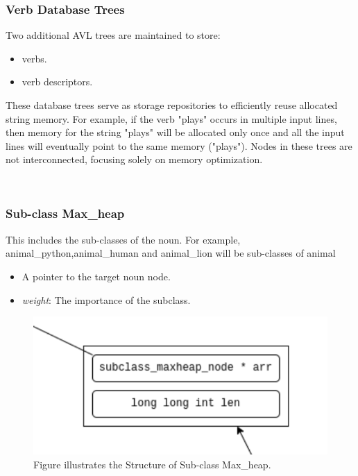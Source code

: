 \documentclass[conference]{IEEEtran}
\begin{document}
\subsubsection{Verb Database Trees}
Two additional AVL trees are maintained to store:
\begin{itemize}
    \item verbs.
    \item verb descriptors.
\end{itemize}
These database trees serve as storage repositories to efficiently reuse allocated string memory. 
For example, if the verb "plays" occurs in multiple input lines, then memory for the string "plays" will be allocated only once and all the input lines will eventually point to the same memory ("plays").   
Nodes in these trees are not interconnected, focusing solely on memory optimization.

\\

\subsubsection{Sub-class Max\_heap}
This includes the sub-classes of the noun. For example, animal\_python,animal\_human and animal\_lion will be sub-classes of animal  
\begin{itemize}
    \item A pointer to the target noun node.
    \item \textit{weight}: The importance of the subclass.
\end{itemize}

\begin{figure}[htbp]
\centering
\includegraphics[width=0.8\linewidth]{subclass_maxheap.png} %
\caption{Figure illustrates the Structure of Sub-class Max\_heap.}
\label{fig}
\end{figure}

\\
\end{document}
